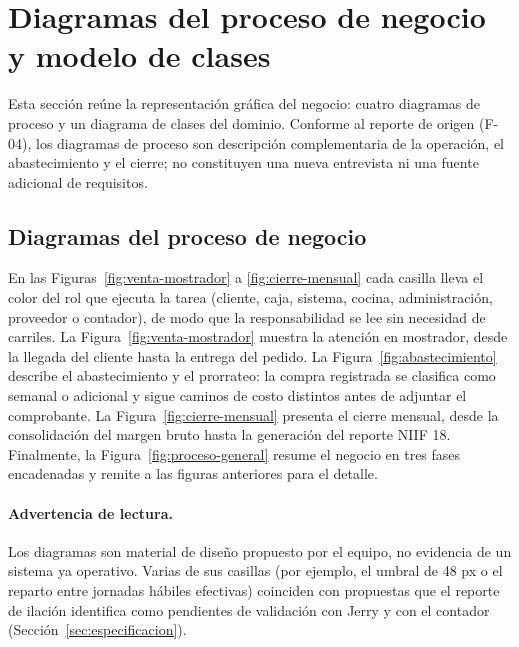 
\section{Diagramas del proceso de negocio y modelo de clases}
\label{sec:diagramas}

Esta sección reúne la representación gráfica del negocio: cuatro diagramas
de proceso y un diagrama de clases del dominio. Conforme al reporte de
origen (F-04), los diagramas de proceso son descripción complementaria de
la operación, el abastecimiento y el cierre; no constituyen una nueva
entrevista ni una fuente adicional de requisitos.

\subsection{Diagramas del proceso de negocio}
\label{subsec:diagramas-proceso}

En las Figuras~\ref{fig:venta-mostrador} a \ref{fig:cierre-mensual} cada
casilla lleva el color del rol que ejecuta la tarea (cliente, caja, sistema,
cocina, administración, proveedor o contador), de modo que la
responsabilidad se lee sin necesidad de carriles. La
Figura~\ref{fig:venta-mostrador} muestra la atención en mostrador, desde la
llegada del cliente hasta la entrega del pedido. La
Figura~\ref{fig:abastecimiento} describe el abastecimiento y el prorrateo:
la compra registrada se clasifica como semanal o adicional y sigue caminos
de costo distintos antes de adjuntar el comprobante. La
Figura~\ref{fig:cierre-mensual} presenta el cierre mensual, desde la
consolidación del margen bruto hasta la generación del reporte NIIF 18.
Finalmente, la Figura~\ref{fig:proceso-general} resume el negocio en tres
fases encadenadas y remite a las figuras anteriores para el detalle.

\paragraph{Advertencia de lectura.} Los diagramas son material de diseño
propuesto por el equipo, no evidencia de un sistema ya operativo. Varias de
sus casillas (por ejemplo, el umbral de 48 px o el reparto entre jornadas
hábiles efectivas) coinciden con propuestas que el reporte de ilación
identifica como pendientes de validación con Jerry y con el contador
(Sección~\ref{sec:especificacion}).

